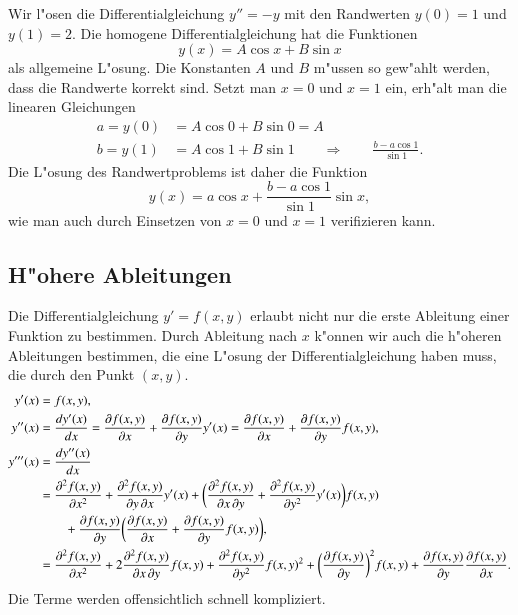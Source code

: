 \begin{beispiel}
Wir l"osen die Differentialgleichung $y''=-y$ mit den Randwerten
$y(0)=1$ und $y(1)=2$.
Die homogene Differentialgleichung hat die Funktionen
\[
y(x)=A \cos x + B\sin x
\]
als allgemeine L"osung.
Die Konstanten $A$ und $B$ m"ussen so gew"ahlt werden, dass die Randwerte
korrekt sind.
Setzt man $x=0$ und $x=1$ ein, erh"alt man die linearen Gleichungen
\begin{align*}
a=y(0)&=A\cos 0 + B\sin 0=A\\
b=y(1)&=A\cos 1 + B\sin 1
\qquad\Rightarrow\qquad
\frac{b-a\cos 1}{\sin 1}.
\end{align*}
Die L"osung des Randwertproblems ist daher die Funktion
\[
y(x)=a\cos x +\frac{b-a\cos 1}{\sin 1}\sin x,
\]
wie man auch durch Einsetzen von $x=0$ und $x=1$ verifizieren kann.
\end{beispiel}

\subsection{H"ohere Ableitungen\label{grundlagen:hoehere-ableitungen}}
Die Differentialgleichung $y'=f(x,y)$ erlaubt nicht nur die erste
Ableitung einer Funktion zu bestimmen.
Durch Ableitung nach $x$ k"onnen wir auch die h"oheren Ableitungen
bestimmen, die eine L"osung der Differentialgleichung haben muss,
die durch den Punkt $(x,y)$.
\begin{align}
y'(x)
&=
f(x,y),
\notag
\\
y''(x)
&=
\frac{dy'(x)}{dx}
=
\frac{\partial f(x,y)}{\partial x} + \frac{\partial f(x,y)}{\partial y}y'(x)
=
\frac{\partial f(x,y)}{\partial x} + \frac{\partial f(x,y)}{\partial y}f(x,y),
\label{grundlagen:2abl}
\\
y'''(x)
&=
\frac{dy''(x)}{dx}
\notag
\\
&=
\frac{\partial^2 f(x,y)}{\partial x^2}
+ \frac{\partial^2 f(x,y)}{\partial y\,\partial x}y'(x)
+ \biggl(\frac{\partial^2 f(x,y)}{\partial x\,\partial y}
+ \frac{\partial^2 f(x,y)}{\partial y^2}y'(x)\biggr)f(x,y)
\notag
\\
&\qquad
+ \frac{\partial f(x,y)}{\partial y}\biggl(
\frac{\partial f(x,y)}{\partial x} + \frac{\partial f(x,y)}{\partial y}f(x,y)
\biggr),
\notag
\\
&=
\frac{\partial^2 f(x,y)}{\partial x^2}
+ 2\frac{\partial^2 f(x,y)}{\partial x\,\partial y}f(x,y)
+ \frac{\partial^2 f(x,y)}{\partial y^2}f(x,y)^2
+ \biggl(\frac{\partial f(x,y)}{\partial y}\biggr)^2 f(x,y)
+ \frac{\partial f(x,y)}{\partial y} \frac{\partial f(x,y)}{\partial x}.
\label{grundlagen:3abl}
\end{align}
Die Terme werden offensichtlich schnell kompliziert.

